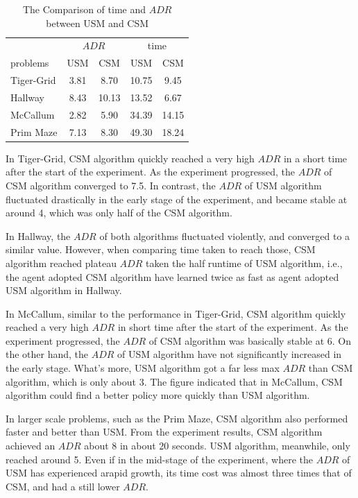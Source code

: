 \documentclass{article}
\begin{document}
\begin{table}[h]
	\caption{The Comparison of time and $ADR$ between USM and CSM}
	\label{table:results}
	\centering
	\begin{tabular}{lcccc}
		\toprule
                  &\multicolumn{2}{c}{$ADR$}      &\multicolumn{2}{c}{time} \\ 
                  \cmidrule(r){2-3}                 \cmidrule(r){4-5}
    problems      & USM         & CSM               &USM           & CSM      \\
    \midrule
		Tiger-Grid    & 3.81        & 8.70              & 10.75        & 9.45     \\ 
		Hallway       & 8.43        & 10.13             & 13.52        & 6.67     \\ 
		McCallum      & 2.82        & 5.90              & 34.39        & 14.15    \\ 
    Prim Maze     & 7.13        & 8.30              & 49.30        & 18.24    \\ 
    \bottomrule
	\end{tabular}
\end{table}

In Tiger-Grid, CSM algorithm quickly reached a very high $ADR$ in a short
time after the start of the experiment. As the experiment progressed, the $ADR$ of
CSM algorithm converged to 7.5. In contrast, the $ADR$ of USM algorithm fluctuated
drastically in the early stage of the experiment, and became stable at around 4, which
was only half of the CSM algorithm.

In Hallway, the $ADR$ of both algorithms fluctuated violently,  
and converged to a similar value. However, when comparing time taken to reach those,
CSM algorithm reached plateau $ADR$ taken the half runtime of USM algorithm, i.e.,
the agent adopted CSM algorithm have learned twice as fast as agent adopted USM algorithm
in Hallway.

In McCallum, similar to the performance in Tiger-Grid, CSM algorithm quickly reached
a very high $ADR$ in short time after the start of the experiment. As the experiment
progressed, the $ADR$ of CSM algorithm was basically stable at 6. On the other hand,
the $ADR$ of USM algorithm have not significantly increased in the early stage. What's more,
USM algorithm got a far less max $ADR$ than CSM algorithm, which is only about 3. The figure
indicated that in McCallum, CSM algorithm could find a better policy more quickly than USM
algorithm.

In larger scale problems, such as the Prim Maze, CSM algorithm also performed
faster and better than USM. From the experiment results, CSM algorithm achieved an
$ADR$ about 8 in about 20 seconds. USM algorithm, meanwhile, only reached around 5.
Even if in the mid-stage of the experiment, where the $ADR$ of USM has experienced arapid growth,
its time cost was almost three times that of CSM, and had a still lower $ADR$.
\end{document}
